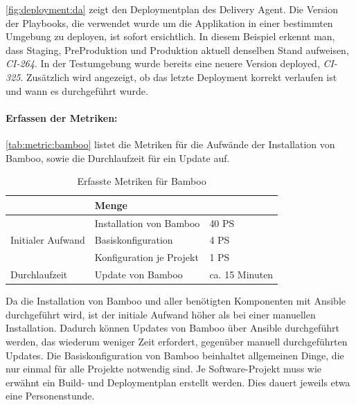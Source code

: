 \autoref{fig:deployment:da} zeigt den Deploymentplan des Delivery Agent. Die Version der Playbooks, die verwendet wurde um die Applikation in einer bestimmten Umgebung zu deployen, ist sofort ersichtlich. In diesem Beispiel erkennt man, dass Staging, PreProduktion und Produktion aktuell denselben Stand aufweisen, \textit{CI-264}. In der Testumgebung wurde bereits eine neuere Version deployed, \textit{CI-325}. Zusätzlich wird angezeigt, ob das letzte Deployment korrekt verlaufen ist und wann es durchgeführt wurde.

\paragraph{Erfassen der Metriken:} \autoref{tab:metric:bamboo} listet die Metriken für die Aufwände der Installation von Bamboo, sowie die Durchlaufzeit für ein Update auf.
\begin{table}[ht]
\setlength{\tabcolsep}{5pt}
\renewcommand{\arraystretch}{1.5}
\centering
\begin{tabular}{|l|l|l|}
\hline
\rowcolor[HTML]{C0C0C0}
\multicolumn{2}{|c|}{\textbf{Metrik}} 				& \textbf{Menge}		\\ 
\hline
\multirow{3}{*}{Initialer Aufwand}	& Installation von Bamboo & 40 PS	\\ 
\cline{2-3}
									& Basiskonfiguration 	 & 4 PS		\\
\cline{2-3}
									& Konfiguration je Projekt & 1 PS	\\
\hline
Durchlaufzeit				 		& Update	 von Bamboo		& ca. 15 Minuten		\\ 
\hline
\end{tabular}
\caption{Erfasste Metriken für Bamboo}
\label{tab:metric:bamboo}
\end{table}
Da die Installation von Bamboo und aller benötigten Komponenten mit Ansible durchgeführt wird, ist der initiale Aufwand höher als bei einer manuellen Installation. Dadurch können Updates von Bamboo über Ansible durchgeführt werden, das wiederum weniger Zeit erfordert, gegenüber manuell durchgeführten Updates. Die Basiskonfiguration von Bamboo beinhaltet allgemeinen Dinge, die nur einmal für alle Projekte notwendig sind. Je Software-Projekt muss wie erwähnt ein Build- und Deploymentplan erstellt werden. Dies dauert jeweils etwa eine Personenstunde.

